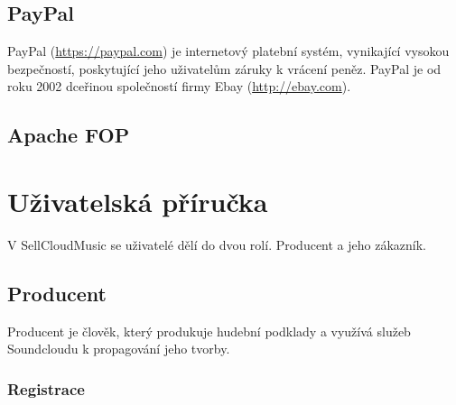 \documentclass[12pt]{article}
\begin{document}
\subsection{PayPal}

PayPal (\url{https://paypal.com}) je internetový platební systém, vynikající vysokou bezpečností, poskytující jeho uživatelům záruky k vrácení peněz.
PayPal je od roku 2002 dceřinou společností firmy Ebay (\url{http://ebay.com}).

\subsection{Apache FOP}\label{fop}

\newpage

\section{Uživatelská příručka}

V SellCloudMusic se uživatelé dělí do dvou rolí. Producent a jeho zákazník.

\subsection{Producent}

Producent je člověk, který produkuje hudební podklady a využívá služeb Soundcloudu k propagování jeho tvorby.

\subsubsection{Registrace} \label{reg}
\end{document}
